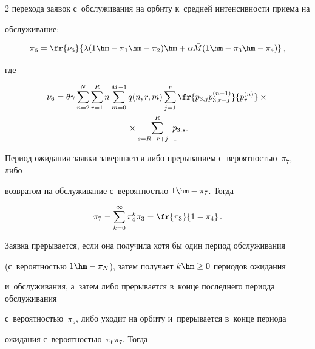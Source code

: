 \begin{multicols}{2}
перехода заявок с~обслуживания на орбиту к~сред\-ней ин\-тен\-сив\-ности приема на 

обслуживание:

$$

\pi_6=\fr{\nu_6}{\lambda(1\hm-\pi_1\hm-\pi_2) \hm+ \alpha \bar{M} (1\hm-

\pi_3\hm-\pi_4)}\,,

$$

 где

\begin{multline*}

   \nu_6=\theta \gamma \sum\limits_{n=2}^N \sum\limits_{r=1}^R n \sum\limits_{m=0}^{M-1} q(n,r,m) 

\sum\limits_{j=1}^r \fr{p_{3,j} p_{3,r-j}^{(n-1)}}{p_r^{(n)}} \times{}\\

{}\times \sum\limits_{s=R-r+j+1}^R \!\!\!\! 

p_{3,s}.

\end{multline*}





Период ожидания заявки завершается либо прерыванием с~ве\-ро\-ят\-ностью~$\pi_7$, либо 

возвратом на обслуживание с~ве\-ро\-ят\-ностью $1\hm-\pi_7$. \mbox{Тогда}

\begin{equation*}


\pi_7=\sum\limits_{k=0}^{\infty} \pi_4^k \pi_3 = \fr{\pi_3}{1-\pi_4}\,.

\end{equation*}



Заявка прерывается, если она получила хотя бы один период обслуживания 

(с~ве\-ро\-ят\-ностью $1\hm-\pi_N$), затем получает $k \hm\geq 0$ периодов ожидания 

и~обслуживания, а~затем либо прерывается в~конце по\-след\-не\-го периода обслуживания 

с~ве\-ро\-ят\-ностью~$\pi_5$, либо уходит на орбиту и~прерывается в~конце периода 

ожидания с~ве\-ро\-ят\-ностью~$\pi_6 \pi_7$. \mbox{Тогда}

\begin{multline*} 



\end{multline*}
\end{multicols}
